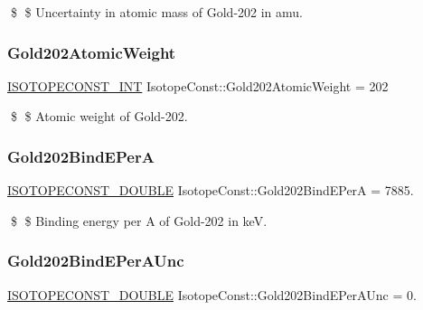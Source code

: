 \$ \$ Uncertainty in atomic mass of Gold-\/202 in amu. \mbox{\label{group___isotope_const-_gold-_au202_gae1412b2720323af2b7d07f9ec93c11fa}} 
\subsubsection{\texorpdfstring{Gold202\+Atomic\+Weight}{Gold202AtomicWeight}}
{\footnotesize\ttfamily \mbox{\hyperlink{group___isotope_const-_macros_ga5f18360b3e99483a35c32d789e62621c}{I\+S\+O\+T\+O\+P\+E\+C\+O\+N\+S\+T\+\_\+\+I\+NT}} Isotope\+Const\+::\+Gold202\+Atomic\+Weight = 202}

\$ \$ Atomic weight of Gold-\/202. \mbox{\label{group___isotope_const-_gold-_au202_ga98036da49e67dac0a0a5675b54fd26f6}} 
\subsubsection{\texorpdfstring{Gold202\+Bind\+E\+PerA}{Gold202BindEPerA}}
{\footnotesize\ttfamily \mbox{\hyperlink{group___isotope_const-_macros_ga8f45a7272ce02c0b4c65c44636ed719a}{I\+S\+O\+T\+O\+P\+E\+C\+O\+N\+S\+T\+\_\+\+D\+O\+U\+B\+LE}} Isotope\+Const\+::\+Gold202\+Bind\+E\+PerA = 7885.}

\$ \$ Binding energy per A of Gold-\/202 in keV. \mbox{\label{group___isotope_const-_gold-_au202_ga2e2dcf8d279f8bb9b8e25315ae765941}} 
\subsubsection{\texorpdfstring{Gold202\+Bind\+E\+Per\+A\+Unc}{Gold202BindEPerAUnc}}
{\footnotesize\ttfamily \mbox{\hyperlink{group___isotope_const-_macros_ga8f45a7272ce02c0b4c65c44636ed719a}{I\+S\+O\+T\+O\+P\+E\+C\+O\+N\+S\+T\+\_\+\+D\+O\+U\+B\+LE}} Isotope\+Const\+::\+Gold202\+Bind\+E\+Per\+A\+Unc = 0.}

